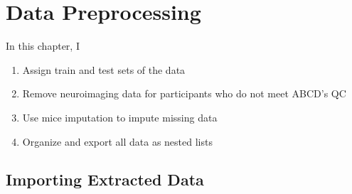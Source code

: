 \documentclass[
  letterpaper,
  DIV=11,
  numbers=noendperiod]{scrreprt}
\providecommand{\tightlist}{%
  \setlength{\itemsep}{0pt}\setlength{\parskip}{0pt}}\usepackage{longtable,booktabs,array}
\begin{document}
\chapter{Data Preprocessing}\label{data-preprocessing}

In this chapter, I

\begin{enumerate}
\def\labelenumi{\arabic{enumi}.}
\tightlist
\item
  Assign train and test sets of the data
\item
  Remove neuroimaging data for participants who do not meet ABCD's QC
\item
  Use mice imputation to impute missing data
\item
  Organize and export all data as nested lists
\end{enumerate}

\section{Importing Extracted Data}\label{importing-extracted-data}
\end{document}
